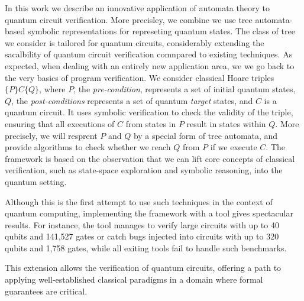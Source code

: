 In this work we describe an innovative application of automata theory to quantum circuit verification.
%
%
More precisley, we  combine we use tree automata-based symbolic representations for represeting quantum states.
%
The class of tree we consider is tailored for quantum circuits, considerably extending the sacalbility of quantum circuit verification comnpared to existing techniques.
%
As expected, when dealing with an entirely new application area, we 
we go back to the very basics of program verification.
%
We consider classical Hoare triples $\{P\} C \{Q\}$, where $P$, the {\it pre-condition}, represents a set of initial quantum states, $Q$, the {\it post-conditions} represents a set of quantum {\it target} states, and $C$ is a quantum circuit.
%
It uses  symbolic verification to check the
validity of the triple, ensuring that all executions of $C$ from states in $P$ result in states within $Q$.
%
More precisely, we will resprent $P$ and $Q$ by a special form of tree automata, and provide algorithms to check whether we reach $Q$ from $P$ if we execute $C$.
%
The framework  is based on the observation that we can lift core concepts of classical verification, such as state-space exploration and symbolic reasoning, into the quantum setting. 



Although this is the first attempt to use such techniques in the context of quantum computing, implementing the framework with a tool gives spectacular results.
%
For instance, the tool manages to verify large circuits with up to 40 qubits and 141,527 gates or catch bugs injected
into circuits with up to 320 qubits and 1,758 gates, while all exiting tools fail to handle such benchmarks.
%

%
This extension allows the verification of quantum circuits, offering a path to applying well-established classical paradigms in a domain where formal guarantees are critical. 




